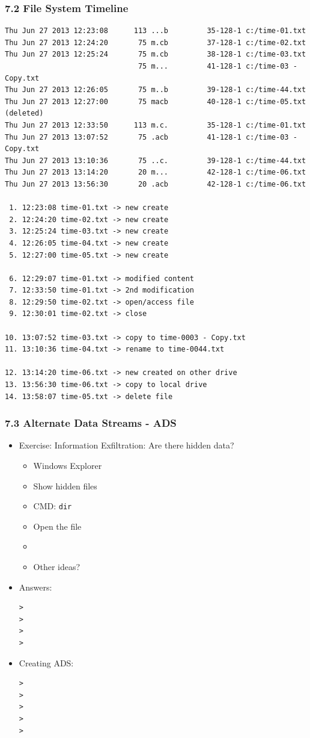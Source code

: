 \begin{frame}[fragile]
  \frametitle{7.2 File System Timeline}
  \begin{lstlisting}[basicstyle=\tiny]
Thu Jun 27 2013 12:23:08      113 ...b         35-128-1 c:/time-01.txt
Thu Jun 27 2013 12:24:20       75 m.cb         37-128-1 c:/time-02.txt
Thu Jun 27 2013 12:25:24       75 m.cb         38-128-1 c:/time-03.txt
                               75 m...         41-128-1 c:/time-03 - Copy.txt
Thu Jun 27 2013 12:26:05       75 m..b         39-128-1 c:/time-44.txt
Thu Jun 27 2013 12:27:00       75 macb         40-128-1 c:/time-05.txt (deleted)
Thu Jun 27 2013 12:33:50      113 m.c.         35-128-1 c:/time-01.txt
Thu Jun 27 2013 13:07:52       75 .acb         41-128-1 c:/time-03 - Copy.txt
Thu Jun 27 2013 13:10:36       75 ..c.         39-128-1 c:/time-44.txt
Thu Jun 27 2013 13:14:20       20 m...         42-128-1 c:/time-06.txt
Thu Jun 27 2013 13:56:30       20 .acb         42-128-1 c:/time-06.txt

 1. 12:23:08 time-01.txt -> new create
 2. 12:24:20 time-02.txt -> new create
 3. 12:25:24 time-03.txt -> new create
 4. 12:26:05 time-04.txt -> new create
 5. 12:27:00 time-05.txt -> new create

 6. 12:29:07 time-01.txt -> modified content
 7. 12:33:50 time-01.txt -> 2nd modification
 8. 12:29:50 time-02.txt -> open/access file
 9. 12:30:01 time-02.txt -> close

10. 13:07:52 time-03.txt -> copy to time-0003 - Copy.txt
11. 13:10:36 time-04.txt -> rename to time-0044.txt

12. 13:14:20 time-06.txt -> new created on other drive
13. 13:56:30 time-06.txt -> copy to local drive
14. 13:58:07 time-05.txt -> delete file
  \end{lstlisting}
\end{frame}


\begin{frame}[fragile]
  \frametitle{7.3 Alternate Data Streams - ADS}
    \begin{itemize}
       \item Exercise: Information Exfiltration: Are there hidden data?
            \begin{itemize}
                \item Windows Explorer
                \item Show hidden files
                \item CMD: \texttt{dir}
                \item Open the file
                \item
                \item Other ideas?
            \end{itemize}
       \item Answers:
  \begin{lstlisting}[basicstyle=\tiny]
>
>
>
>
  \end{lstlisting}
       \item Creating ADS:
  \begin{lstlisting}[basicstyle=\tiny]
>
>
>
>
>
  \end{lstlisting}
    \end{itemize}
\end{frame}


